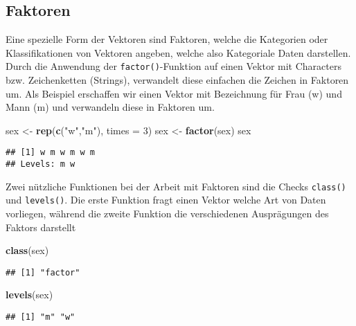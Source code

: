 \documentclass[
]{book}
\newenvironment{Shaded}{\begin{snugshade}}{\end{snugshade}}
\newcommand{\DataTypeTok}[1]{\textcolor[rgb]{0.13,0.29,0.53}{#1}}
\newcommand{\DecValTok}[1]{\textcolor[rgb]{0.00,0.00,0.81}{#1}}
\newcommand{\KeywordTok}[1]{\textcolor[rgb]{0.13,0.29,0.53}{\textbf{#1}}}
\newcommand{\NormalTok}[1]{#1}
\newcommand{\StringTok}[1]{\textcolor[rgb]{0.31,0.60,0.02}{#1}}
\begin{document}
\hypertarget{faktoren}{%
\subsection{Faktoren}\label{faktoren}}

Eine spezielle Form der Vektoren sind Faktoren, welche die Kategorien oder Klassifikationen von
Vektoren angeben, welche also Kategoriale Daten darstellen.
Durch die Anwendung der \texttt{factor()}-Funktion auf einen Vektor mit Characters bzw. Zeichenketten (Strings), verwandelt diese einfachen die Zeichen in Faktoren um.
Als Beispiel erschaffen wir einen Vektor mit Bezeichnung für Frau (w) und Mann (m) und verwandeln
diese in Faktoren um.

\begin{Shaded}
\begin{Highlighting}[]
\NormalTok{sex <-}\StringTok{ }\KeywordTok{rep}\NormalTok{(}\KeywordTok{c}\NormalTok{(}\StringTok{"w"}\NormalTok{,}\StringTok{"m"}\NormalTok{), }\DataTypeTok{times =} \DecValTok{3}\NormalTok{)}
\NormalTok{sex <-}\StringTok{ }\KeywordTok{factor}\NormalTok{(sex)}
\NormalTok{sex}
\end{Highlighting}
\end{Shaded}

\begin{verbatim}
## [1] w m w m w m
## Levels: m w
\end{verbatim}

Zwei nützliche Funktionen bei der Arbeit mit Faktoren sind die Checks \texttt{class()} und \texttt{levels()}.
Die erste Funktion fragt einen Vektor welche Art von Daten vorliegen, während die zweite Funktion die verschiedenen Ausprägungen des Faktors darstellt

\begin{Shaded}
\begin{Highlighting}[]
\KeywordTok{class}\NormalTok{(sex)}
\end{Highlighting}
\end{Shaded}

\begin{verbatim}
## [1] "factor"
\end{verbatim}

\begin{Shaded}
\begin{Highlighting}[]
\KeywordTok{levels}\NormalTok{(sex)}
\end{Highlighting}
\end{Shaded}

\begin{verbatim}
## [1] "m" "w"
\end{verbatim}
\end{document}

